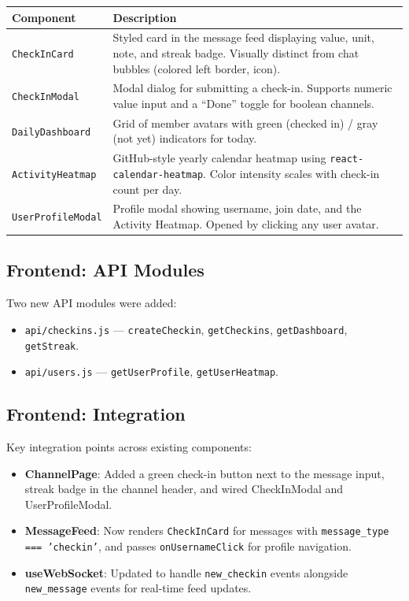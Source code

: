 \documentclass[11pt]{article}
\begin{document}
\begin{center}
\begin{tabularx}{\textwidth}{@{}lX@{}}
\toprule
\textbf{Component} & \textbf{Description} \\
\midrule
\texttt{CheckInCard} & Styled card in the message feed displaying value, unit, note, and streak badge. Visually distinct from chat bubbles (colored left border, icon). \\
\texttt{CheckInModal} & Modal dialog for submitting a check-in. Supports numeric value input and a ``Done'' toggle for boolean channels. \\
\texttt{DailyDashboard} & Grid of member avatars with green (checked in) / gray (not yet) indicators for today. \\
\texttt{ActivityHeatmap} & GitHub-style yearly calendar heatmap using \texttt{react-calendar-heatmap}. Color intensity scales with check-in count per day. \\
\texttt{UserProfileModal} & Profile modal showing username, join date, and the Activity Heatmap. Opened by clicking any user avatar. \\
\bottomrule
\end{tabularx}
\end{center}

\subsection{Frontend: API Modules}

Two new API modules were added:

\begin{itemize}[leftmargin=1.5em]
    \item \texttt{api/checkins.js} --- \texttt{createCheckin}, \texttt{getCheckins}, \texttt{getDashboard}, \texttt{getStreak}.
    \item \texttt{api/users.js} --- \texttt{getUserProfile}, \texttt{getUserHeatmap}.
\end{itemize}

\subsection{Frontend: Integration}

Key integration points across existing components:

\begin{itemize}[leftmargin=1.5em]
    \item \textbf{ChannelPage}: Added a green check-in button next to the message input, streak badge in the channel header, and wired CheckInModal and UserProfileModal.
    \item \textbf{MessageFeed}: Now renders \texttt{CheckInCard} for messages with \texttt{message\_type === 'checkin'}, and passes \texttt{onUsernameClick} for profile navigation.
    \item \textbf{useWebSocket}: Updated to handle \texttt{new\_checkin} events alongside \texttt{new\_message} events for real-time feed updates.
\end{itemize}
\end{document}
